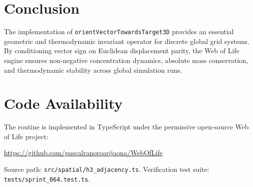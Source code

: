 \documentclass[11pt,a4paper]{article}
\theoremstyle{plain}
\theoremstyle{definition}
\begin{document}
\section{Conclusion}
The implementation of \texttt{orientVectorTowardsTarget3D} provides an essential geometric and thermodynamic invariant operator for discrete global grid systems. By conditioning vector sign on Euclidean displacement parity, the Web of Life engine ensures non-negative concentration dynamics, absolute mass conservation, and thermodynamic stability across global simulation runs.

\section*{Code Availability}
The routine is implemented in TypeScript under the permissive open-source Web of Life project:
\begin{center}
    \url{https://github.com/pascalranoroarijaona/WebOfLife}
\end{center}
Source path: \texttt{src/spatial/h3\_adjacency.ts}. Verification test suite: \texttt{tests/sprint\_064.test.ts}.
\end{document}
